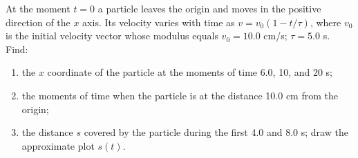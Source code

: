 
\item At the moment \( t = 0 \) a particle leaves the origin and moves in the positive direction of the \( x \) axis. Its velocity varies with time as \( v = v_0 (1 - t/\tau) \), where \( v_0 \) is the initial velocity vector whose modulus equals \( v_0 = 10.0 \) cm/s; \( \tau = 5.0 \) s. Find:
    \begin{enumerate}
        \item the \( x \) coordinate of the particle at the moments of time 6.0, 10, and 20 s;
        \item the moments of time when the particle is at the distance 10.0 cm from the origin;
        \item the distance \( s \) covered by the particle during the first 4.0 and 8.0 s; draw the approximate plot \( s(t) \).
    \end{enumerate}


